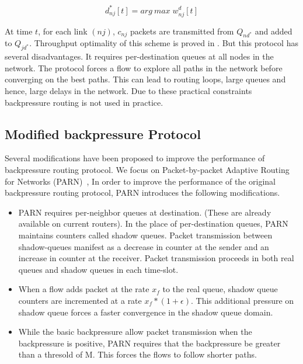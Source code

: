 \begin{equation}
d^{*}_{nj}[t] = arg\:max\;{w_{nj}^{d}[t]}
\end{equation}

At time $t$, for each link $(nj)$, $c_{nj}$ packets are transmitted from $Q_{nd^{*}}$ and added to $Q_{jd^{*}}$. Throughput optimality of this scheme is proved in \cite{BP-orig}. But this protocol has several disadvantages. It requires per-destination queues at all nodes in the network. The protocol forces a flow to explore all paths in the network before converging on the best paths. This can lead to routing loops, large queues and hence, large delays in the network. Due to these practical constraints backpressure routing is not used in practice.

\subsection{Modified backpressure Protocol}
Several modifications have been proposed to improve the performance of backpressure routing protocol. We focus on Packet-by-packet Adaptive Routing for Networks (PARN)~\cite{Srikant3}, In order to improve the performance of the original backpressure routing protocol, PARN introduces the following modifications.
\begin{itemize}
\item PARN requires per-neighbor queues at destination. (These are already available on current routers). In the place of per-destination queues, PARN maintains counters called shadow queues. Packet transmission between shadow-queues manifest as a decrease in counter at the sender and an increase in counter at the receiver. Packet transmission proceeds in both real queues and shadow queues in each time-slot.

\item When a flow adds packet at the rate $x_{f}$ to the real queue, shadow queue counters are incremented at a rate $ x_{f} * (1+\epsilon)$. This additional pressure on shadow queue forces a faster convergence in the shadow queue domain. 

\item While the basic backpressure allow packet transmission when the backpressure is positive, PARN requires that the backpressure be greater than a thresold of M. This forces the flows to follow shorter paths.
\end{itemize}
